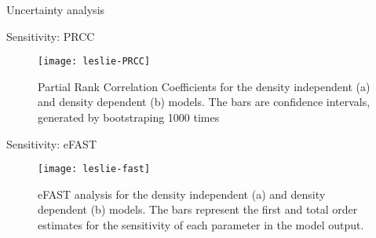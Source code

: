 \documentclass[final]{beamer}
\begin{document}
\begin{frame}{}
\begin{columns}[t]
\begin{column}{.48\linewidth}
\begin{block}{Uncertainty analysis}
\begin{figure}
{%
}
		\end{figure}
        \end{block}
		\vfill
        \begin{block}{Sensitivity: PRCC}
		\begin{figure}
		\begin{center}
		\texttt{[image: leslie-PRCC]}
		\end{center}
		\caption{Partial Rank Correlation Coefficients for the density independent (a) and density dependent (b) models. The bars are confidence intervals, generated by bootstraping 1000 times}
		\end{figure}
        \end{block}
		\vfill
        \begin{block}{Sensitivity: eFAST}
		\begin{figure}
		\begin{center}
		\texttt{[image: leslie-fast]}
		\end{center}
		\caption{eFAST analysis for the density independent (a) and density dependent (b) models. The bars represent the first and total order estimates for the sensitivity of each parameter in the model output.}
		\end{figure}
        \end{block}
      \end{column}
    \end{columns}
  \end{frame}
\end{document}
